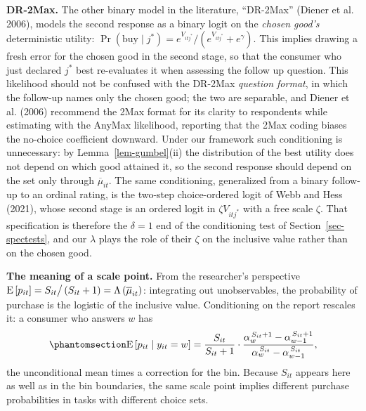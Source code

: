 \documentclass[
  letterpaper,
  DIV=11,
  numbers=noendperiod]{scrartcl}
\theoremstyle{plain}
\theoremstyle{plain}
\theoremstyle{plain}
\theoremstyle{remark}
\begin{document}
\textbf{DR-2Max.} The other binary model in the literature, ``DR-2Max''
(Diener et al. 2006), models the second response as a binary logit on
the \emph{chosen good's} deterministic utility:
\(\Pr(\text{buy} \mid j^*) = e^{V_{itj^*}} \big/ \left( e^{V_{itj^*}} + e^{\gamma} \right)\).
This implies drawing a fresh error for the chosen good in the second
stage, so that the consumer who just declared \(j^*\) best re-evaluates
it when assessing the follow up question. This likelihood should not be
confused with the DR-2Max \emph{question format}, in which the follow-up
names only the chosen good; the two are separable, and Diener et al.
(2006) recommend the 2Max format for its clarity to respondents while
estimating with the AnyMax likelihood, reporting that the 2Max coding
biases the no-choice coefficient downward. Under our framework such
conditioning is unnecessary: by Lemma~\ref{lem-gumbel}(ii) the
distribution of the best utility does not depend on which good attained
it, so the second response should depend on the set only through
\(\overline{\mu}_{it}\). The same conditioning, generalized from a
binary follow-up to an ordinal rating, is the two-step choice-ordered
logit of Webb and Hess (2021), whose second stage is an ordered logit in
\(\zeta V_{itj^*}\) with a free scale \(\zeta\). That specification is
therefore the \(\delta = 1\) end of the conditioning test of
Section~\ref{sec-spectests}, and our \(\lambda\) plays the role of their
\(\zeta\) on the inclusive value rather than on the chosen good.

\textbf{The meaning of a scale point.} From the researcher's perspective
\(\operatorname{E} \left[ p_{it} \right] = S_{it} \big/ \left( S_{it} + 1 \right) = \Lambda \left( \overline{\mu}_{it} \right)\):
integrating out unobservables, the probability of purchase is the
logistic of the inclusive value. Conditioning on the report rescales it:
a consumer who answers \(w\) has
\begin{equation}\protect\phantomsection\label{eq-condexp}{
\E \left[ p_{it} \mid y_{it} = w \right] = \frac{S_{it}}{S_{it}+1} \cdot \frac{\alpha_w^{\,S_{it}+1} - \alpha_{w-1}^{\,S_{it}+1}}{\alpha_w^{\,S_{it}} - \alpha_{w-1}^{\,S_{it}}},
}\end{equation} the unconditional mean times a correction for the bin.
Because \(S_{it}\) appears here as well as in the bin boundaries, the
same scale point implies different purchase probabilities in tasks with
different choice sets.
\end{document}
